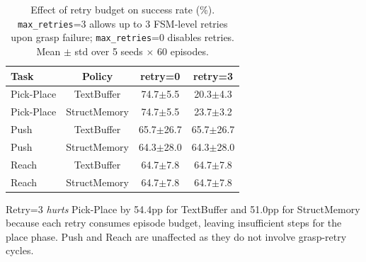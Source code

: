 \begin{table}[t]
\centering
\caption{Effect of retry budget on success rate (\%). \texttt{max\_retries}=3 allows up to 3 FSM-level retries upon grasp failure; \texttt{max\_retries}=0 disables retries. Mean $\pm$ std over 5 seeds $\times$ 60 episodes.}
\label{tab:retry}
\begin{tabular}{l ccc}
\toprule
Task & Policy & retry=0 & retry=3 \\
\midrule
Pick-Place & TextBuffer & 74.7$\pm$5.5 & 20.3$\pm$4.3 \\
Pick-Place & StructMemory & 74.7$\pm$5.5 & 23.7$\pm$3.2 \\
\midrule
Push & TextBuffer & 65.7$\pm$26.7 & 65.7$\pm$26.7 \\
Push & StructMemory & 64.3$\pm$28.0 & 64.3$\pm$28.0 \\
\midrule
Reach & TextBuffer & 64.7$\pm$7.8 & 64.7$\pm$7.8 \\
Reach & StructMemory & 64.7$\pm$7.8 & 64.7$\pm$7.8 \\
\bottomrule
\end{tabular}
\vspace{2mm}

\small Retry=3 \emph{hurts} Pick-Place by 54.4pp for TextBuffer and 51.0pp for StructMemory because each retry consumes episode budget, leaving insufficient steps for the place phase. Push and Reach are unaffected as they do not involve grasp-retry cycles.
\end{table}
